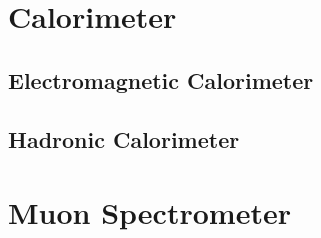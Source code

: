 
\section*{Calorimeter}


\subsection*{Electromagnetic Calorimeter}

\subsection*{Hadronic Calorimeter}

\section*{Muon Spectrometer}

